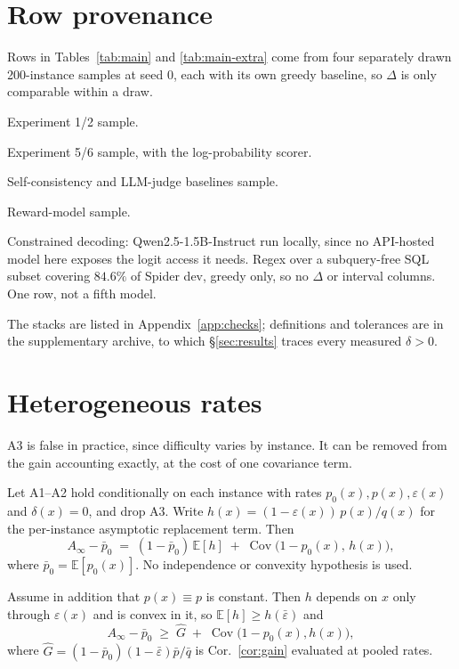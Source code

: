 \documentclass[11pt]{article}
\begin{document}
\section{Row provenance}\label{app:tabnotes}
Rows in Tables~\ref{tab:main} and \ref{tab:main-extra} come from four separately
drawn 200-instance samples at seed 0, each with its own greedy baseline, so
$\Delta$ is only comparable within a draw.

\begin{description}\setlength\itemsep{0.15em}
\item[h] Experiment 1/2 sample.
\item[i] Experiment 5/6 sample, with the log-probability scorer.
\item[k] Self-consistency and LLM-judge baselines sample.
\item[m] Reward-model sample.
\item[n] Constrained decoding: Qwen2.5-1.5B-Instruct run locally, since no
  API-hosted model here exposes the logit access it needs. Regex over a
  subquery-free SQL subset covering $84.6\%$ of Spider dev, greedy only, so no
  $\Delta$ or interval columns. One row, not a fifth model.
\end{description}

The stacks are listed in Appendix~\ref{app:checks}; definitions and tolerances
are in the supplementary archive, to which \S\ref{sec:results} traces every
measured $\delta>0$.

\section{Heterogeneous rates}\label{app:hetero}

A3 is false in practice, since difficulty varies by instance. It can be removed from the gain accounting exactly, at the cost of one covariance term.

\begin{proposition}\label{prop:hetero}
Let A1--A2 hold conditionally on each instance with rates $p_0(x),p(x),\varepsilon(x)$ and $\delta(x)=0$, and drop A3. Write $h(x)=(1-\varepsilon(x))\,p(x)/q(x)$ for the per-instance asymptotic replacement term. Then
\[
A_\infty-\bar p_0 \;=\; (1-\bar p_0)\,\mathbb{E}[h] \;+\; \operatorname{Cov}\bigl(1-p_0(x),\,h(x)\bigr),
\]
where $\bar p_0=\mathbb{E}[p_0(x)]$. No independence or convexity hypothesis is used.
\end{proposition}

\begin{corollary}\label{cor:jensen}
Assume in addition that $p(x)\equiv p$ is constant. Then $h$ depends on $x$ only through $\varepsilon(x)$ and is convex in it, so $\mathbb{E}[h]\ge h(\bar\varepsilon)$ and
\[
A_\infty-\bar p_0\;\ge\;\widehat{G}\;+\;\operatorname{Cov}\bigl(1-p_0(x),h(x)\bigr),
\]
where $\widehat{G}=(1-\bar p_0)(1-\bar\varepsilon)\bar p/\bar q$ is Cor.~\ref{cor:gain} evaluated at pooled rates.
\end{corollary}
\end{document}
